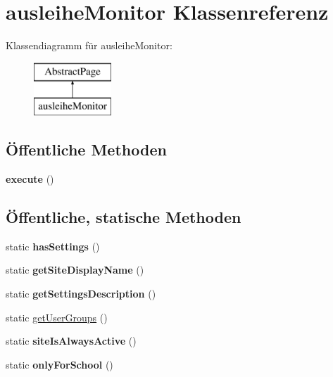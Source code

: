 \hypertarget{classausleihe_monitor}{}\section{ausleihe\+Monitor Klassenreferenz}
\label{classausleihe_monitor}
Klassendiagramm für ausleihe\+Monitor\+:\begin{figure}[H]
\begin{center}
\leavevmode
\includegraphics[height=2.000000cm]{classausleihe_monitor}
\end{center}
\end{figure}
\subsection*{Öffentliche Methoden}
\begin{DoxyCompactItemize}
\item 
\mbox{\label{classausleihe_monitor_a4530f7177e85c0392f65c7559e05deaf}} 
{\bfseries execute} ()
\end{DoxyCompactItemize}
\subsection*{Öffentliche, statische Methoden}
\begin{DoxyCompactItemize}
\item 
\mbox{\label{classausleihe_monitor_a0b9ce6d85d786209cc106de4d22286c7}} 
static {\bfseries has\+Settings} ()
\item 
\mbox{\label{classausleihe_monitor_a1936fcf5aacdc1fa76f9cfc932b8fa74}} 
static {\bfseries get\+Site\+Display\+Name} ()
\item 
\mbox{\label{classausleihe_monitor_a468335e8cfd8a44b60ae9f37afba557d}} 
static {\bfseries get\+Settings\+Description} ()
\item 
static \mbox{\hyperlink{classausleihe_monitor_a46042bfbc217f7837e7b01720a5f315e}{get\+User\+Groups}} ()
\item 
\mbox{\label{classausleihe_monitor_a37c43d02de7220d10c4b00dc8530a89f}} 
static {\bfseries site\+Is\+Always\+Active} ()
\item 
\mbox{\label{classausleihe_monitor_a6113dfc2f2e60d306e2ba9fc8528c777}} 
static {\bfseries only\+For\+School} ()
\end{DoxyCompactItemize}
